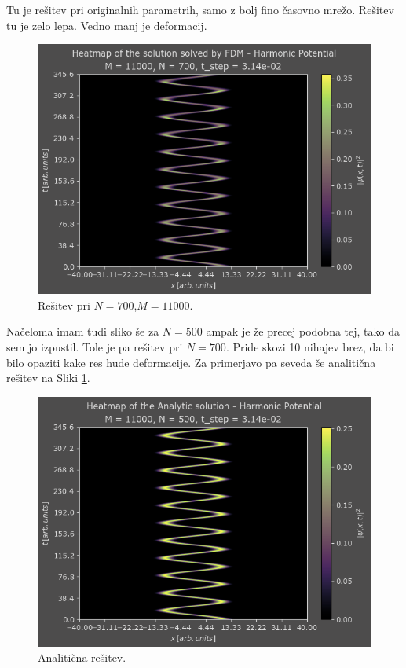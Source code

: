 \documentclass[a4paper]{article}
\begin{document}
Tu je rešitev pri originalnih parametrih, samo z bolj fino časovno mrežo. Rešitev tu
je zelo lepa. Vedno manj je deformacij. 

\begin{figure}[H]
    \centering
    \includegraphics[width=\textwidth]{./images/case1_N700.png}
    \caption{Rešitev pri $N=700$,$M=11000$.}
\end{figure}

Načeloma imam tudi sliko še za $N=500$ ampak je že precej podobna tej, tako da sem jo izpustil.
Tole je pa rešitev pri $N=700$. Pride skozi 10 nihajev brez, da bi bilo opaziti kake res hude deformacije.
Za primerjavo pa seveda še analitična rešitev na Sliki \ref{fig:harmonic_oscillator_analytic}.

\begin{figure}[H]
    \centering
    \includegraphics[width=\textwidth]{./images/case1_analytic.png}
    \caption{Analitična rešitev.}
    \label{fig:harmonic_oscillator_analytic}
\end{figure}
\end{document}
